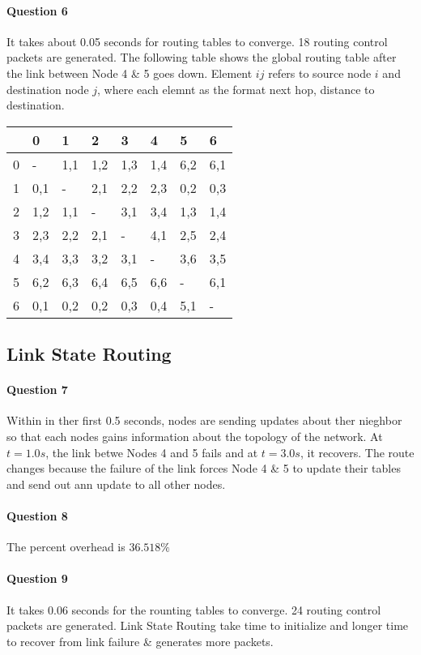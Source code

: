 \documentclass[12pt]{article}
\begin{document}
\paragraph{Question 6}
It takes about 0.05 seconds for routing tables to converge. 18 routing control packets are generated. The following table shows the global routing table after the link between Node 4 \& 5 goes down. Element $ij$ refers to source node $i$ and destination node $j$, where each elemnt as the format next hop, distance to destination. \\
\begin{center}
\begin{tabular}{ *{8}{ l |} }
		& 0 	& 1	& 2 	& 3 	& 4 	& 5 	& 6   \\ \hline
	0 	&- 	&1,1	&1,2	&1,3	&1,4	&6,2	&6,1 \\ \hline
	1 	&0,1	&- 	&2,1 	&2,2	&2,3 	&0,2 	&0,3 \\ \hline
	2 	&1,2	&1,1 	&- 	&3,1 	&3,4 	&1,3 	&1,4 \\ \hline
	3 	&2,3	&2,2 	&2,1 	&- 	&4,1 	&2,5 	&2,4 \\ \hline
	4 	&3,4 	&3,3 	&3,2 	&3,1 	&- 	&3,6 	&3,5 \\ \hline
	5 	&6,2	&6,3 	&6,4 	&6,5 	&6,6 	&- 	&6,1 \\ \hline
	6	&0,1	&0,2 	&0,2 	&0,3 	&0,4 	&5,1 	&-     \\ \hline
\end{tabular}
\end{center}
\subsection{Link State Routing}
\paragraph{Question 7}
Within in ther first 0.5 seconds, nodes are sending updates about ther nieghbor so that each nodes gains information about the topology of the network. At $t = 1.0s$, the link betwe Nodes 4 and 5 fails and at $t = 3.0s$, it recovers. The route changes because the failure of the link forces Node 4 \& 5 to update their tables and send out ann update to all other nodes. 
\paragraph{Question 8}
The percent overhead is $36.518\%$
\paragraph{Question 9}
It takes 0.06 seconds for the rounting tables to converge. 24 routing control packets are generated. Link State Routing take time to initialize and longer time to recover from link failure \& generates more packets.
\end{document}
